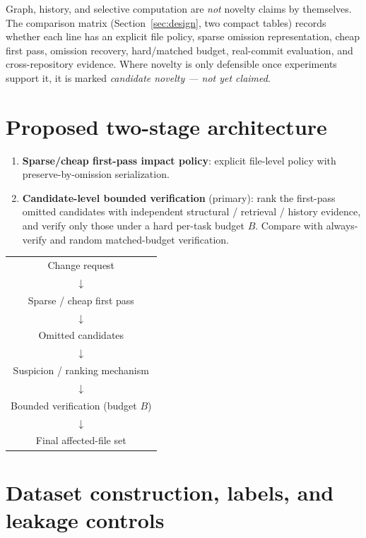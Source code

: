 \documentclass[11pt,a4paper]{article}
\begin{document}
Graph, history, and selective computation are \emph{not} novelty claims by
themselves. The comparison matrix (Section~\ref{sec:design}, two compact
tables) records whether each line has an explicit file policy, sparse omission
representation, cheap first pass, omission recovery, hard/matched budget,
real-commit evaluation, and cross-repository evidence. Where novelty is only
defensible once experiments support it, it is marked \emph{candidate novelty
--- not yet claimed}.

\section{Proposed two-stage architecture}
\label{sec:architecture}

\begin{enumerate}
  \item \textbf{Sparse/cheap first-pass impact policy}: explicit file-level
        policy with preserve-by-omission serialization.
  \item \textbf{Candidate-level bounded verification} (primary): rank the
        first-pass omitted candidates with independent structural / retrieval /
        history evidence, and verify only those under a hard per-task budget
        $B$. Compare with always-verify and random matched-budget verification.
\end{enumerate}

\begin{center}
\begin{tabular}{@{}c@{}}
\hline
Change request \\
$\downarrow$ \\
Sparse / cheap first pass \\
$\downarrow$ \\
Omitted candidates \\
$\downarrow$ \\
Suspicion / ranking mechanism \\
$\downarrow$ \\
Bounded verification (budget $B$) \\
$\downarrow$ \\
Final affected-file set \\
\hline
\end{tabular}
\end{center}

\section{Dataset construction, labels, and leakage controls}
\label{sec:dataset}
\end{document}
